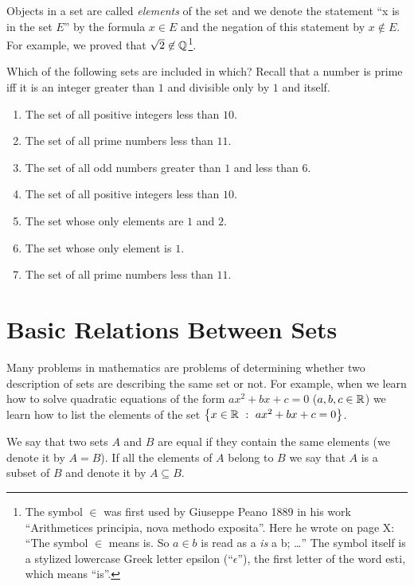 Objects in a set are called \textit{elements} of the set and we denote the
statement ``x is in the set $E$'' by the formula $x \in E$ and the negation of
this statement by $x \not\in E$. For example, we proved that
$\sqrt{2} \not\in \mathbb{Q}$\footnote{%
  The symbol $\in$ was first used by Giuseppe Peano 1889 in his work
  ``Arithmetices principia, nova methodo exposita''. Here he wrote on page X:
  ``The symbol $\in$ means is. So $a \in b$ is read as a \textit{is} a b;
  \dots''
  The symbol itself is a stylized lowercase Greek letter epsilon
  (``$\epsilon$''), the first letter of the word  \textgreek{esti}, which means
  ``is''.
}.

\begin{exercise}
  \label{exercise:inclusion}

  Which of the following sets are included in which? Recall that a number is
  prime iff it is an integer greater than $1$ and divisible only by $1$ and
  itself.
  \begin{enumerate}
    \item The set of all positive integers less than $10$.
    \item The set of all prime numbers less than $11$.
    \item The set of all odd numbers greater than $1$ and less than $6$.
    \item The set of all positive integers less than $10$.
    \item The set whose only elements are $1$ and $2$.
    \item The set whose only element is $1$.
    \item The set of all prime numbers less than $11$.
  \end{enumerate}
\end{exercise}

\section{Basic Relations Between Sets}
Many problems in mathematics are problems of determining whether two description
of sets are describing the same set or not. For example, when we learn how to
solve quadratic equations of the form $ax^2 + bx + c = 0$ ($a, b, c \in \mathbb{R}$) we
learn how to list the elements of the set $\set[ax^2 + bx + c = 0]{x \in \R}$.

We say that two sets $A$ and $B$ are equal if they contain the
same elements (we denote it by $A = B$). If all the elements of $A$ belong to
$B$ we say that $A$ is a subset of $B$ and denote it by $A \subseteq B$.

